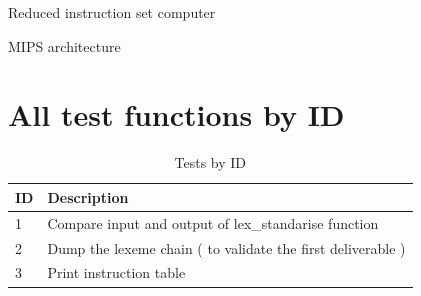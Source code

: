 \documentclass[twoside,twocolumn]{article}
\begin{document}

\begin{thebibliography}{99} %


\newblock Reduced instruction set computer

\newblock MIPS architecture

\newblock 

\end{thebibliography}


\appendix
\section{All test functions by ID}

\begin{table}[!h]
\caption{Tests by ID}
\centering
\begin{tabular}{|p{2cm}|p{2cm}|}
\hline
ID & Description \\
\hline
1 & Compare input and output of lex\_standarise function \\
\hline
2 & Dump the lexeme chain ( to validate the first deliverable ) \\
\hline
3 & Print instruction table \\
\hline
\end{tabular}
\end{table}


% 
\end{document}

